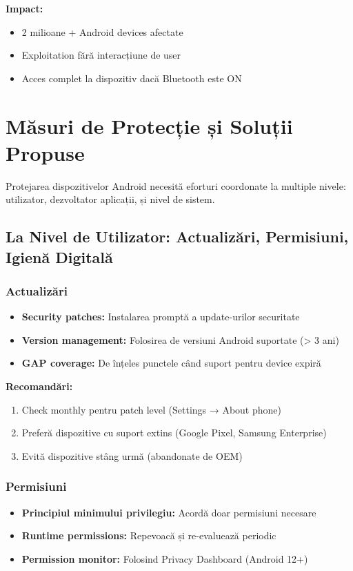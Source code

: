\documentclass[11pt,a4paper,twocolumn]{article}
\theoremstyle{definition}
\theoremstyle{plain}
\theoremstyle{remark}
\begin{document}
\textbf{Impact:}
\begin{itemize}
    \item 2 milioane + Android devices afectate
    \item Exploitation fără interacțiune de user
    \item Acces complet la dispozitiv dacă Bluetooth este ON
\end{itemize}

\section{Măsuri de Protecție și Soluții Propuse}

Protejarea dispozitivelor Android necesită eforturi coordonate la multiple nivele: utilizator, 
dezvoltator aplicații, și nivel de sistem.

\subsection{La Nivel de Utilizator: Actualizări, Permisiuni, Igienă Digitală}

\subsubsection{Actualizări}
\begin{itemize}
    \item \textbf{Security patches:} Instalarea promptă a update-urilor securitate
    \item \textbf{Version management:} Folosirea de versiuni Android suportate (> 3 ani)
    \item \textbf{GAP coverage:} De înțeles punctele când suport pentru device expiră
\end{itemize}

\textbf{Recomandări:}
\begin{enumerate}
    \item Check monthly pentru patch level (Settings → About phone)
    \item Preferă dispozitive cu suport extins (Google Pixel, Samsung Enterprise)
    \item Evită dispozitive stâng urmă (abandonate de OEM)
\end{enumerate}

\subsubsection{Permisiuni}
\begin{itemize}
    \item \textbf{Principiul minimului privilegiu:} Acordă doar permisiuni necesare
    \item \textbf{Runtime permissions:} Repevoacă și re-evaluează periodic
    \item \textbf{Permission monitor:} Folosind Privacy Dashboard (Android 12+)
\end{itemize}
\end{document}

